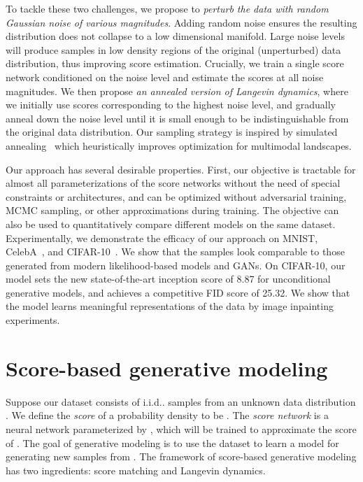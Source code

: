 \documentclass{article}
\makeatletter
\def\@onedot{\ifx\@let@token.\else.\null\fi\xspace}
\DeclareRobustCommand\onedot{\futurelet\@let@token\@onedot}
\def\iid{i.i.d\onedot}
\makeatother
\begin{document}
To tackle these two challenges, we propose to \emph{perturb the data with random Gaussian noise of various magnitudes}. Adding random noise ensures the resulting distribution does not collapse to a low dimensional manifold. Large noise levels 
will produce samples in low density regions of the original (unperturbed) data distribution,  
thus improving score estimation. 
Crucially, we train a single score network conditioned on the noise level 
and estimate the scores 
at all noise magnitudes. 
We then propose \emph{an annealed version of Langevin dynamics}, where we initially use scores corresponding to the highest noise level, and gradually anneal down the noise level until it is small enough to be indistinguishable from the original data distribution. Our sampling strategy is inspired by simulated annealing~\cite{kirkpatrick83optimizationby,neal2001annealed} which heuristically improves optimization 
for multimodal landscapes. 


Our approach has several desirable properties. First, our objective is tractable for almost all parameterizations of the score networks without the need of special constraints or architectures, and can be optimized without adversarial training, MCMC sampling, or other approximations during training. The objective can also be used to quantitatively compare different models on the same dataset. Experimentally, we demonstrate the efficacy of our approach on MNIST, CelebA~\cite{liu2015faceattributes}, and CIFAR-10~\cite{Krizhevsky09learningmultiple}. We show that the samples look comparable to those generated from modern likelihood-based models and GANs. On CIFAR-10, our model sets the new state-of-the-art inception score of 8.87 for unconditional generative models, and achieves a competitive FID score of 25.32. We show that the model learns meaningful representations of the data by image inpainting experiments.

 \section{Score-based generative modeling}
Suppose our dataset consists of \iid samples  from an unknown data distribution . We define the \emph{score} of a probability density  to be . The \emph{score network}  is a neural network parameterized by , which will be trained to approximate the score of . The goal of generative modeling is to use the dataset to learn a model for generating new samples from . The framework of score-based generative modeling has two ingredients: score matching and Langevin dynamics.
\end{document}
